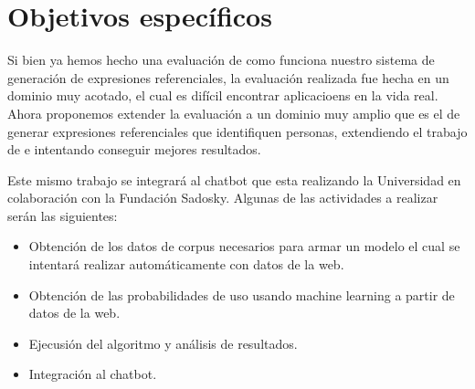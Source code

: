 \section{Objetivos espec\'ificos}
\label{objetivos}

Si bien ya hemos hecho una evaluaci\'on de como funciona nuestro sistema de generaci\'on de expresiones referenciales, la evaluaci\'on realizada 
fue hecha en un dominio muy acotado, el cual es dif\'icil encontrar aplicacioens en la vida real. Ahora proponemos
extender la evaluaci\'on a un dominio muy amplio que es el de generar expresiones referenciales que identifiquen personas, extendiendo el
trabajo de \cite{PachecoDuboue} e intentando conseguir mejores resultados.

Este mismo trabajo se integrar\'a al chatbot que esta realizando la Universidad en colaboraci\'on con la Fundaci\'on Sadosky.
Algunas de las actividades a realizar ser\'an las siguientes:
\begin{itemize}

\item Obtenci\'on de los datos de corpus necesarios para armar un modelo el cual se intentar\'a realizar autom\'aticamente con datos de la web.
\item Obtenci\'on de las probabilidades de uso usando machine learning a partir de datos de la web.
\item Ejecusi\'on del algoritmo y an\'alisis de resultados.
\item Integraci\'on al chatbot.
\end{itemize}
